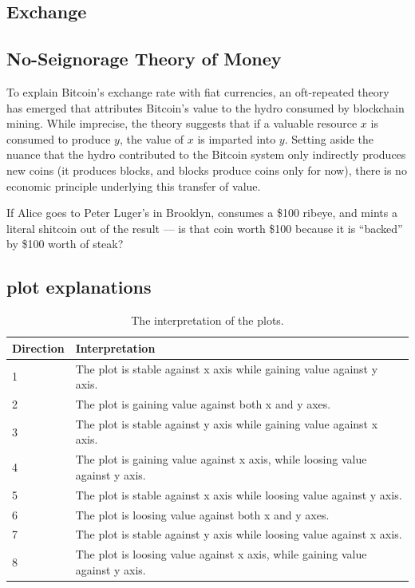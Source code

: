 \subsection{Exchange}

\clearpage
\subsection{No-Seignorage Theory of Money}

To explain Bitcoin's exchange rate with fiat currencies, an oft-repeated theory has emerged that attributes Bitcoin's value to the hydro consumed by blockchain mining. While imprecise, the theory suggests that if a valuable resource $x$ is consumed to produce $y$, the value of $x$ is imparted into $y$. Setting aside the nuance that the hydro contributed to the Bitcoin system only indirectly produces new coins (it produces blocks, and blocks produce coins only for now), there is no economic principle underlying this transfer of value.

If Alice goes to Peter Luger's in Brooklyn, consumes a \$100 ribeye, and mints a literal shitcoin out of the result --- is that coin worth \$100 because it is ``backed'' by \$100 worth of steak?

\subsection{plot explanations}


\begin{table}[t]
\centering
\begin{tabular}{|l|l|}
\hline
\textbf{Direction} & \textbf{Interpretation}   \\ \hline

         1                & The plot is stable against x axis while gaining value against y axis. \\ \hline
         2                & The plot is gaining value against both x and y axes. \\ \hline
         3                & The plot is stable against y axis while gaining value against x axis. \\ \hline
         4                & The plot is gaining value against x axis, while loosing value against y axis. \\ \hline
         5                & The plot is stable against x axis while loosing value against y axis. \\ \hline
         6                & The plot is loosing value against both x and y axes. \\ \hline
         7                & The plot is stable against y axis while loosing value against x axis. \\ \hline
         8                & The plot is loosing value against x axis, while gaining value against y axis. \\ \hline
          
\end{tabular}
\caption{\footnotesize{The interpretation of the plots.}\label{tab:plotlegend}}
\end{table}



